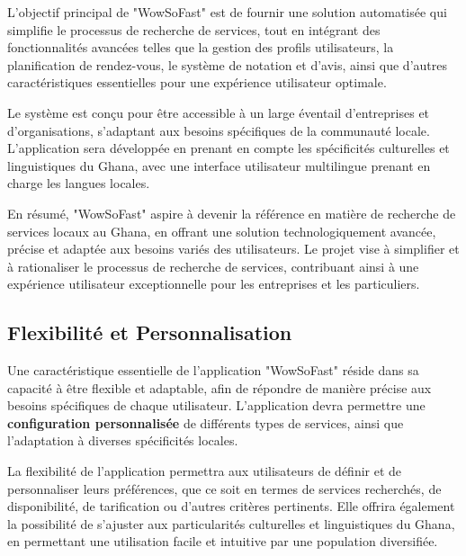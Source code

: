 {\vspace{0.5cm}

L'objectif principal de "WowSoFast" est de fournir une solution automatisée qui simplifie le processus de recherche de services, tout en intégrant des fonctionnalités avancées telles que la gestion des profils utilisateurs, la planification de rendez-vous, le système de notation et d'avis, ainsi que d'autres caractéristiques essentielles pour une expérience utilisateur optimale.

\vspace{0.5cm}

Le système est conçu pour être accessible à un large éventail d'entreprises et d'organisations, s'adaptant aux besoins spécifiques de la communauté locale. L'application sera développée en prenant en compte les spécificités culturelles et linguistiques du Ghana, avec une interface utilisateur multilingue prenant en charge les langues locales.

\vspace{0.5cm}

En résumé, "WowSoFast" aspire à devenir la référence en matière de recherche de services locaux au Ghana, en offrant une solution technologiquement avancée, précise et adaptée aux besoins variés des utilisateurs. Le projet vise à simplifier et à rationaliser le processus de recherche de services, contribuant ainsi à une expérience utilisateur exceptionnelle pour les entreprises et les particuliers.
 
\subsection{Flexibilité et Personnalisation}

Une caractéristique essentielle de l'application "WowSoFast" réside dans sa capacité à être flexible et adaptable, afin de répondre de manière précise aux besoins spécifiques de chaque utilisateur. L'application devra permettre une \textbf{configuration personnalisée} de différents types de services, ainsi que l'adaptation à diverses spécificités locales.

\vspace{0.5cm}

La flexibilité de l'application permettra aux utilisateurs de définir et de personnaliser leurs préférences, que ce soit en termes de services recherchés, de disponibilité, de tarification ou d'autres critères pertinents. Elle offrira également la possibilité de s'ajuster aux particularités culturelles et linguistiques du Ghana, en permettant une utilisation facile et intuitive par une population diversifiée.

}

